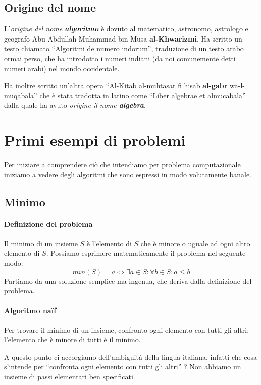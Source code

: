 \subsection*{Origine del nome}

L'\emph{origine del nome \textbf{algoritmo}}  è dovuto al matematico, astronomo, astrologo e geografo Abu Abdullah Muhammad bin Musa \textbf{al-Khwarizmi}.
Ha scritto un testo chiamato \enquote{Algoritmi de numero indorum}, traduzione di un testo arabo ormai perso, che ha introdotto i numeri indiani (da noi comunemente detti numeri arabi) nel mondo occidentale.

Ha inoltre scritto un'altra opera \enquote{Al-Kitab al-muhtasar fi hisab \textbf{al-gabr} wa-l-muqabala} che è stata tradotta in latino come \enquote{Liber algebrae et almucabala} dalla quale ha avuto \emph{origine il nome \textbf{algebra}}.

\section{Primi esempi di problemi}

Per iniziare a comprendere ciò che intendiamo per problema computazionale iniziamo a vedere degli algoritmi che sono espressi in modo volutamente banale.

\subsection{Minimo}

\paragraph{Definizione del problema}
Il minimo di un insieme \(S\) è l'elemento di \(S\) che è minore o uguale ad ogni altro elemento di \(S\).
Possiamo esprimere matematicamente il problema nel seguente modo:
\[
    min(S) = a \Leftrightarrow \exists a \in S \colon \forall b \in S \colon a \leqslant b
\]
Partiamo da una soluzione semplice ma ingenua, che deriva dalla definizione del problema.

\paragraph{Algoritmo na\"if}
Per trovare il minimo di un insieme, confronto ogni elemento con tutti gli altri; l'elemento che è minore di tutti è il minimo.

A questo punto ci accorgiamo dell'ambiguità della lingua italiana, infatti che cosa s'intende per \enquote{confronta ogni elemento con tutti gli altri} ?
Non abbiamo un insieme di passi elementari ben specificati.

